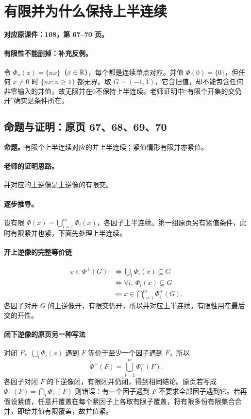 \clearpage\section{有限并为什么保持上半连续}\label{g:108:67}

\textbf{对应原课件：108，第 67--70 页。}


\paragraph{有限性不能删掉：补充反例。}
令 $\Phi_n(x)=\{nx\}$（$x\in\mathbb{R}$），每个都是连续单点对应。并值 $\Phi(0)=\{0\}$，但任何 $x\ne0$ 时 $\{nx:n\ge1\}$ 都无界。取 $G=(-1,1)$，它含旧值，却不能包含任何非零输入的并值，故无限并在0不保持上半连续。老师证明中“有限个开集的交仍开”确实是条件所在。


\subsection{命题与证明：原页 67、68、69、70}

\textbf{命题。}有限个上半连续对应的并上半连续；紧值情形有限并亦紧值。

\paragraph{老师的证明思路。}并对应的上逆像是上逆像的有限交。

\paragraph{逐步推导。}
设有限 $\Phi(x)=\bigcup_{i=1}^m\Phi_i(x)$，各因子上半连续。第一组原页另有紧值条件，此时有限紧并也紧，下面先处理上半连续。
\paragraph{开上逆像的完整等价链}
\begin{align*}
x\in\Phi^+(G)&\iff\bigcup_i\Phi_i(x)\subseteq G\\
&\iff\forall i,\ \Phi_i(x)\subseteq G\\
&\iff x\in\bigcap_{i=1}^m\Phi_i^+(G).
\end{align*}
各因子对开 $G$ 的上逆像开，有限交仍开，所以并对应上半连续。有限性用在最后交的开性。
\paragraph{闭下逆像的原页另一种写法}
对闭 $F$，$\bigcup_i\Phi_i(x)$ 遇到 $F$ 等价于至少一个因子遇到 $F$，所以
\[\Phi^-(F)=\bigcup_{i=1}^m\Phi_i^-(F).\]
各因子对闭 $F$ 的下逆像闭，有限闭并仍闭，得到相同结论。原页若写成 $\Phi^-(F)=\bigcap_i\Phi_i^-(F)$ 则错误：有一个因子遇到 $F$ 不要求全部因子遇到它。若再假设紧值，任意开覆盖在每个紧因子上各取有限子覆盖，将有限多份有限集合合并，即给并值有限覆盖，故并值紧。


